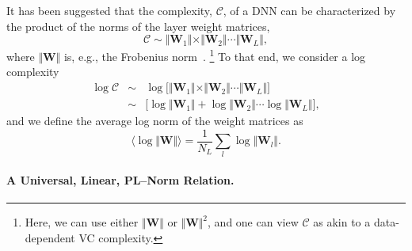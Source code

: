 It has been suggested that the complexity, $\mathcal{C}$, of a DNN can be characterized by the product of the norms of the layer weight matrices,
$$
\mathcal{C}\sim\Vert\mathbf{W}_{1}\Vert\times\Vert\mathbf{W}_{2}\Vert\cdots\Vert\mathbf{W}_{L}\Vert ,
$$
where $\Vert\mathbf{W}\Vert$ is, e.g., the Frobenius norm~\cite{LMBx18_TR, SHNx17_TR,PLMx18_TR}.%
\footnote{Here, we can use either $\Vert\mathbf{W}\Vert$ or $\Vert\mathbf{W}\Vert^{2}$, and one can view $\mathcal{C}$ as akin to a data-dependent VC complexity.}
To that end, we consider a log complexity
\begin{eqnarray*}
\log\mathcal{C} &\sim& \log\bigg[\Vert\mathbf{W}_{1}\Vert\times\Vert\mathbf{W}_{2}\Vert\cdots\Vert\mathbf{W}_{L}\Vert\bigg]  \\
                &\sim& \bigg[\log\Vert\mathbf{W}_{1}\Vert+\log\Vert\mathbf{W}_{2}\Vert\cdots\log\Vert\mathbf{W}_{L}\Vert\bigg]  ,
\end{eqnarray*}
and we define the average log norm of the weight matrices as
\begin{equation}
\langle\log\Vert\mathbf{W}\Vert\rangle=\dfrac{1}{N_{L}}\sum_{l}\log\Vert\mathbf{W}_{l}\Vert  .
\label{eqn:av_log_norm}
\end{equation}



\paragraph{A Universal, Linear, PL--Norm Relation.} 

